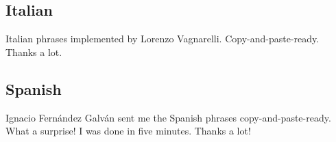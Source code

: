 \documentclass[a4paper,notitlepage,parskip=half]{scrreprt}
\begin{document}
\subsection{Italian}
Italian phrases implemented by Lorenzo Vagnarelli. Copy-and-paste-ready. Thanks a lot.
\allrsphrases[alt42]

\subsection{Spanish}
Ignacio Fernández Galván sent me the Spanish phrases copy-and-paste-ready. What a surprise! I was done in five minutes. Thanks a lot!
\allrsphrases[alt42]
\end{document}
